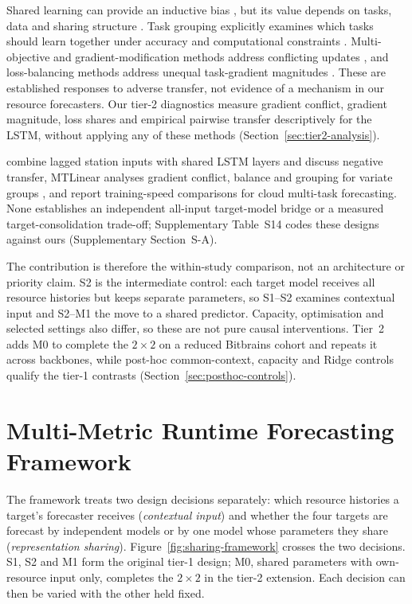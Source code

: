 \documentclass[5p,twocolumn]{elsarticle}
\begin{document}
Shared learning can provide an inductive bias \citep{Caruana1997Multitask},
but its value depends on tasks, data and sharing structure
\citep{Yu2025MultitaskFundamentals}. Task grouping explicitly examines which
tasks should learn together under accuracy and computational constraints
\citep{Standley2020TaskGrouping,Fifty2021TaskGroupings}.
Multi-objective and gradient-modification methods address conflicting updates
\citep{Sener2018MultiObjective,Yu2020GradientSurgery}, and loss-balancing
methods address unequal task-gradient magnitudes \citep{Chen2018GradNorm}.
These are established responses to adverse transfer, not evidence of a
mechanism in our resource forecasters. Our tier-2 diagnostics measure
gradient conflict, gradient magnitude, loss shares and empirical pairwise
transfer descriptively for the LSTM, without applying any of these methods
(Section~\ref{sec:tier2-analysis}).

\citet{Nikentari2022NARMAXLSTM} combine lagged station inputs with shared LSTM
layers and discuss negative transfer, MTLinear analyses gradient conflict,
balance and grouping for variate groups \citep{Nochumsohn2025MTLinear}, and
\citet{Bi2019CloudMultitask} report training-speed comparisons for cloud
multi-task forecasting. None establishes an independent all-input
target-model bridge or a measured target-consolidation trade-off;
Supplementary Table~S14 codes these designs
against ours (Supplementary Section~S-A).

The contribution is therefore the within-study comparison, not an
architecture or priority claim. S2 is the intermediate control: each target
model receives all resource histories but keeps separate parameters, so S1--S2
examines contextual input and S2--M1 the move to a shared predictor.
Capacity, optimisation and selected settings also differ, so these are not
pure causal interventions. Tier~2 adds M0 to complete the $2\times2$ on a
reduced Bitbrains cohort and repeats it across backbones, while post-hoc
common-context, capacity and Ridge controls qualify the tier-1 contrasts
(Section~\ref{sec:posthoc-controls}).

\section{Multi-Metric Runtime Forecasting Framework}
\label{sec:framework}

The framework treats two design decisions separately: which resource
histories a target's forecaster receives (\emph{contextual input}) and
whether the four targets are forecast by independent models or by one model
whose parameters they share (\emph{representation sharing}).
Figure~\ref{fig:sharing-framework} crosses the two decisions. S1, S2 and M1
form the original tier-1 design; M0, shared parameters with own-resource
input only, completes the $2\times2$ in the tier-2 extension. Each decision
can then be varied with the other held fixed.
\end{document}
